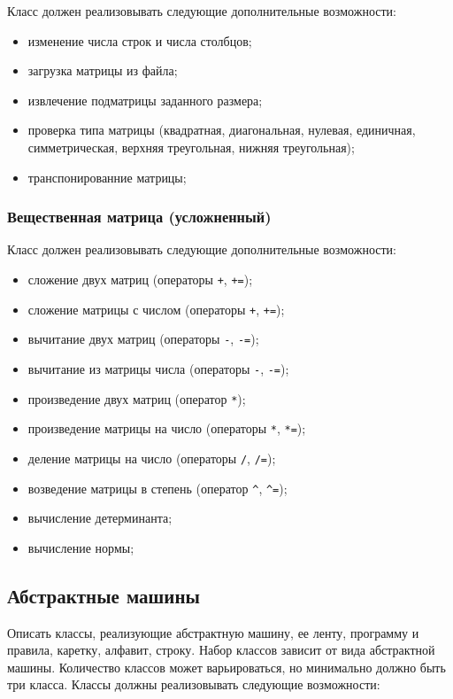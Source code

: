 \documentclass[a4paper,12pt]{article}
\begin{document}
Класс должен реализовывать следующие дополнительные возможности:

\begin{itemize}
\item изменение числа строк и числа столбцов;
\item загрузка матрицы из файла;
\item извлечение подматрицы заданного размера;
\item проверка типа матрицы (квадратная, диагональная, нулевая,
  единичная, симметрическая, верхняя треугольная, нижняя треугольная);
\item транспонированние матрицы;
\end{itemize}

\subsubsection{Вещественная матрица (усложненный)}

Класс должен реализовывать следующие дополнительные возможности:

\begin{itemize}
\item сложение двух матриц (операторы \lstinline|+|, \lstinline|+=|);
\item сложение матрицы с числом (операторы \lstinline|+|,
  \lstinline|+=|);
\item вычитание двух матриц (операторы \lstinline|-|, \lstinline|-=|);
\item вычитание из матрицы числа (операторы \lstinline|-|,
  \lstinline|-=|);
\item произведение двух матриц (оператор \lstinline|*|);
\item произведение матрицы на число (операторы \lstinline|*|,
  \lstinline|*=|);
\item деление матрицы на число (операторы \lstinline|/|,
  \lstinline|/=|);
\item возведение матрицы в степень (оператор \lstinline|^|,
  \lstinline|^=|);
\item вычисление детерминанта;
\item вычисление нормы;
\end{itemize}

\subsection{Абстрактные машины}

Описать классы, реализующие абстрактную машину, ее ленту, программу и
правила, каретку, алфавит, строку. Набор классов зависит от вида
абстрактной машины. Количество классов может варьироваться, но
минимально должно быть три класса.  Классы должны реализовывать
следующие возможности:
\end{document}
